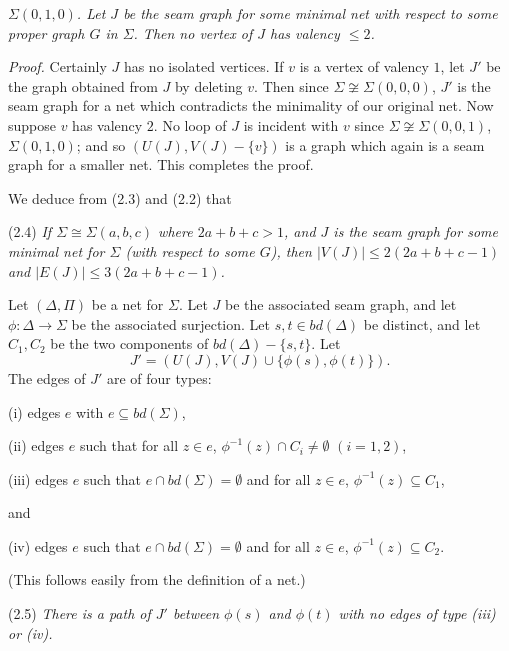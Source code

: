\noindent \textit{$\Sigma(0, 1, 0)$. Let $J$ be the seam graph for some minimal net with respect to some proper graph $G$ in $\Sigma$. Then no vertex of $J$ has valency $\le 2$.}

\textit{Proof.} Certainly $J$ has no isolated vertices. If $v$ is a vertex of valency $1$, let $J'$ be the graph obtained from $J$ by deleting $v$. Then since $\Sigma \not\cong \Sigma(0, 0, 0)$, $J'$ is the seam graph for a net which contradicts the minimality of our original net. Now suppose $v$ has valency $2$. No loop of $J$ is incident with $v$ since $\Sigma \not\cong \Sigma(0, 0, 1)$, $\Sigma(0, 1, 0)$; and so $(U(J), V(J) - \{v\})$ is a graph which again is a seam graph for a smaller net. This completes the proof.

We deduce from (2.3) and (2.2) that

\stmt
(2.4) \textit{If $\Sigma \cong \Sigma(a, b, c)$ where $2a + b + c > 1$, and $J$ is the seam graph for some minimal net for $\Sigma$ (with respect to some $G$), then $|V(J)| \le 2(2a + b + c - 1)$ and $|E(J)| \le 3(2a + b + c - 1)$.}

Let $(\Delta, \Pi)$ be a net for $\Sigma$. Let $J$ be the associated seam graph, and let $\phi \colon \Delta \to \Sigma$ be the associated surjection. Let $s, t \in bd(\Delta)$ be distinct, and let $C_1, C_2$ be the two components of $bd(\Delta) - \{s, t\}$. Let
\begin{equation*}
J' = (U(J), V(J) \cup \{\phi(s), \phi(t)\}).
\end{equation*}
The edges of $J'$ are of four types:

\hspace*{12pt}(i) edges $e$ with $e \subseteq bd(\Sigma)$,

\hspace*{12pt}(ii) edges $e$ such that for all $z \in e$, $\phi^{-1}(z) \cap C_i \ne \emptyset$ $(i = 1, 2)$,

\hspace*{12pt}(iii) edges $e$ such that $e \cap bd(\Sigma) = \emptyset$ and for all $z \in e$, $\phi^{-1}(z) \subseteq C_1$,

and

\hspace*{12pt}(iv) edges $e$ such that $e \cap bd(\Sigma) = \emptyset$ and for all $z \in e$, $\phi^{-1}(z) \subseteq C_2$.

(This follows easily from the definition of a net.)

\stmt
(2.5) \textit{There is a path of $J'$ between $\phi(s)$ and $\phi(t)$ with no edges of type (iii) or (iv).}

